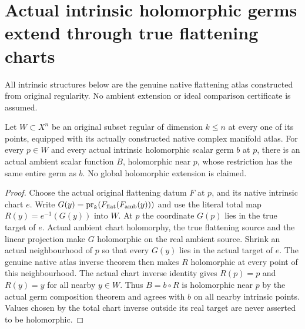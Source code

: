 \section{Actual intrinsic holomorphic germs extend through true flattening charts}

All intrinsic structures below are the genuine native flattening atlas
constructed from original regularity. No ambient extension or ideal
comparison certificate is assumed.

\begin{theorem}
\label{hir:actual-submanifold-holomorphic-germ-extension}
\leanok
Let $W\subset X^n$ be an original subset regular of dimension $k\le n$
at every one of its points, equipped with its actually constructed native
complex manifold atlas. For every $p\in W$ and every actual intrinsic
holomorphic scalar germ $b$ at $p$, there is an actual ambient scalar
function $B$, holomorphic near $p$, whose restriction has the same entire
germ as $b$. No global holomorphic extension is claimed.
\end{theorem}
\begin{proof}
Choose the actual original flattening datum $F$ at $p$, and its native
intrinsic chart $e$. Write $G(y)=\operatorname{pr}_k(F_{\rm flat}(F_{\rm amb}(y)))$
and use the literal total map $R(y)=e^{-1}(G(y))$ into $W$. At $p$ the
coordinate $G(p)$ lies in the true target of $e$. Actual ambient chart
holomorphy, the true flattening source and the linear projection make
$G$ holomorphic on the real ambient source. Shrink an actual neighbourhood
of $p$ so that every $G(y)$ lies in the actual target of $e$. The genuine
native atlas inverse theorem then makes $R$ holomorphic at every point
of this neighbourhood. The actual chart inverse identity gives
$R(p)=p$ and $R(y)=y$ for all nearby $y\in W$. Thus $B=b\circ R$ is
holomorphic near $p$ by the actual germ composition theorem and agrees
with $b$ on all nearby intrinsic points. Values chosen by the total chart
inverse outside its real target are never asserted to be holomorphic.
\end{proof}

